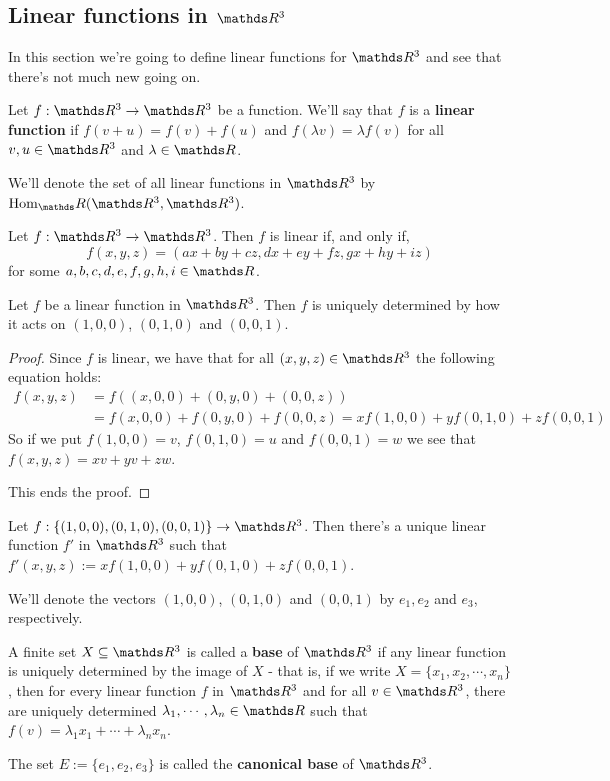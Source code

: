 \newpage
\subsection{Linear functions in $\R^3$}

In this section we're going to define linear functions for $\R^3$ and see that there's not much new going on.

\begin{df}
	Let $f:\R^3\to \R^3$ be a function. We'll say that $f$ is a \textbf{linear function} if $f(v+u)=f(v)+f(u)$ and $f(\lambda v)=\lambda f(v)$ for all $v,u\in \R^3$ and $\lambda\in \R$.
	
	We'll denote the set of all linear functions in $\R^3$ by $\hom_\R(\R^3,\R^3)$.
\end{df}

\begin{prop}
	Let $f:\R^3\to\R^3$. Then $f$ is linear if, and only if, $$f(x,y,z)=(ax+by+cz,dx+ey+fz,gx+hy+iz)$$ for some $a,b,c,d,e,f,g,h,i\in\R$.
\end{prop}

\begin{lemma}
	Let $f$ be a linear function in $\R^3$. Then $f$ is uniquely determined by how it acts on $(1,0,0)$, $(0,1,0)$ and $(0,0,1)$.
\end{lemma}
\begin{proof}
	Since $f$ is linear, we have that for all $(x,y,z)\in\R^3$ the following equation holds:
	\begin{align*}
	f(x,y,z)&=f((x,0,0)+(0,y,0)+(0,0,z))\\
	&=f(x,0,0)+f(0,y,0)+f(0,0,z)=xf(1,0,0)+yf(0,1,0)+zf(0,0,1)
	\end{align*}So if we put $f(1,0,0)=v$, $f(0,1,0)=u$ and $f(0,0,1)=w$ we see that $f(x,y,z)=xv+yv+zw$.
	
	This ends the proof.
\end{proof}
\begin{cor}
	Let $f:\{(1,0,0),(0,1,0),(0,0,1)\}\to\R^3$. Then there's a unique linear function $f'$ in $\R^3$ such that $f'(x,y,z):=xf(1,0,0)+yf(0,1,0)+zf(0,0,1)$.
\end{cor}

\begin{df}
	We'll denote the vectors $(1,0,0)$, $(0,1,0)$ and $(0,0,1)$ by $e_1,e_2$ and $e_3$, respectively.
\end{df}
\begin{df}
	A finite set $X\subseteq\R^3$ is called a \textbf{base} of $\R^3$ if any linear function is uniquely determined by the image of $X$ - that is, if we write $X=\{x_1,x_2,\cdots,x_n\}$, then for every linear function $f$ in $\R^3$ and for all $v\in \R^3$, there are uniquely determined $\lambda_1,\cdots,\lambda_n\in \R$ such that $f(v)=\lambda_1x_1+\cdots+\lambda_nx_n$.
\end{df}
\begin{df}
	The set $E:=\{e_1,e_2,e_3\}$ is called the \textbf{canonical base} of $\R^3$.
\end{df}

